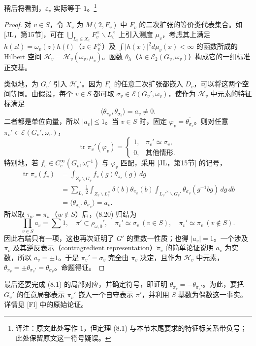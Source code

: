 稍后将看到，$\varepsilon_v$ 实际等于 $1$。\footnote{译注：原文此处写作 $1$，但定理 (8.1) 与本节末尾要求的特征标关系带负号；此处保留原文这一符号疑误。}
\begin{proof}
对 $v\in S$，令 $X_v$ 为 $M(2,F_v)$ 中 $F_v$ 的二次扩张的等价类代表集合。如 [JL，第15节]，可在
$\bigcup_{L_v\in X_v}F_v^\times\backslash L_v^\times$ 上引入测度 $\mu_v$，考虑其上满足
$h(zl)=\omega_v(z)h(l)$（$z\in F_v^\times$）及 $\int|h(x)|^2d\mu_v(x)<\infty$ 的函数所成的 Hilbert 空间
$\mathcal H_v=\mathcal H_v(\omega_v,\mu_v)$。函数 $\theta_\lambda$（$\lambda\in\mathcal E_2(G_v,\omega_v)$）构成它的一组标准正交基。

类似地，为 $G_v'$ 引入 $\mathcal H_v'$。因为 $F_v$ 的任意二次扩张都嵌入 $D_v$，可以将这两个空间等同。由假设，每个 $v\in S$ 都可取
$\sigma_v\in\mathcal E(G_v',\omega_v)$，使作为 $\mathcal H_v$ 中元素的特征标满足
\[
 \langle\theta_{\pi_v},\theta_{\sigma_v}\rangle=a_v\ne0.
\]
二者都是单位向量，所以 $|a_v|\le1$。当 $v\in S$ 时，固定
$\varphi_v=\overline{\theta_{\sigma_v}}$。则对任意 $\pi_v'\in\mathcal E(G_v',\omega_v)$，
\[
 \operatorname{tr}\pi_v'(\varphi_v)
 =\begin{cases}1,&\pi_v'\simeq\sigma_v,\\0,&\text{其他情形}.
 \end{cases}
\]
特别地，若 $f_v\in C_c^\infty(G_v,\omega_v^{-1})$ 与 $\varphi_v$ 匹配，采用 [JL，第15节] 的记号，
\[
\begin{aligned}
 \operatorname{tr}\pi_v(f_v)
 &=\int_{Z_v\backslash G_v}f_v(g)\theta_{\pi_v}(g)\,dg\\
 &=\sum_{L_v}\frac12\int_{Z_v\backslash L_v^\times}
 \delta(b)\theta_{\pi_v}(b)
 \int_{L_v'^\times\backslash G_v'}\theta_{\sigma_v}(g^{-1}bg)\,dg\,db\\
 &=\langle\theta_{\pi_v},\theta_{\sigma_v}\rangle=a_v.
\end{aligned}
\]
所以取 $\tau_w=\pi_w$（$w\notin S$）后，(8.20) 归结为
\[
 \prod_{v\in S}a_v=\sum1,
 \quad\pi'\subset\rho_{\omega,0}',\quad
 \pi_v'\simeq\sigma_v\ (v\in S),\quad\pi_v'\simeq\pi_v\ (v\notin S).
\]
因此右端只有一项，这也再次证明了 $G'$ 的重数一性质；也得 $|a_v|=1$。一个涉及
$\pi_v$ 及其逆反表示（contragredient representation）$\widetilde\pi_v$ 的简单论证说明 $a_v$ 为实数，所以
$a_v=\pm1$。于是 $\pi_v'=\sigma_v$ 完全由 $\pi_v$ 决定，且作为 $\mathcal H_v$ 中元素，
$\theta_{\pi_v}=\pm\theta_{\pi_v'}=\theta_{\sigma_v}$。命题得证。
\end{proof}

最后还要完成 (8.1) 的局部对应，并确定符号，即证明 $\theta_{\pi_v}=-\theta_{\pi_v'}$。为此，要把
$G_v'$ 的任意局部表示 $\pi_v'$ 嵌入一个自守表示 $\pi'$，并利用 $S$ 基数为偶数这一事实。详情见
[Fl] 中的原始论证。

